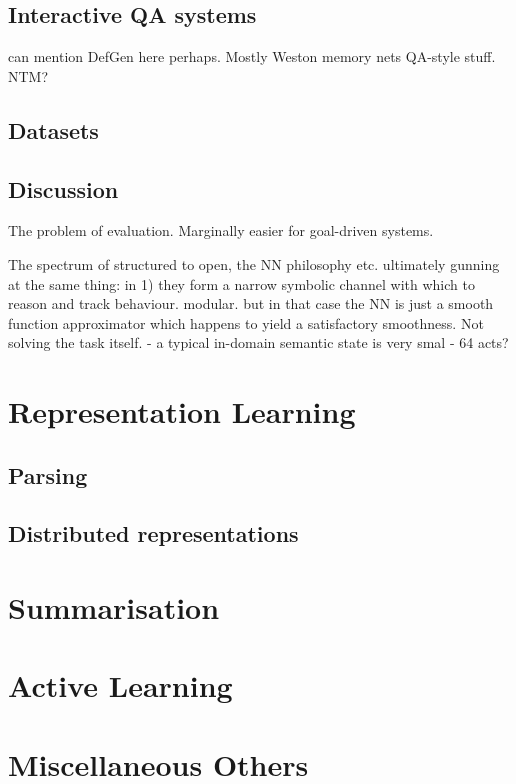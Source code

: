 \documentclass[11pt,letterpaper]{article}
\begin{document}
\subsection{Interactive QA systems}

can mention DefGen here perhaps. Mostly Weston memory nets QA-style stuff. NTM? 

\subsection{Datasets}

\subsection{Discussion}

The problem of evaluation. Marginally easier for goal-driven systems. 

The spectrum of structured to open, the NN philosophy etc. 
ultimately gunning at the same thing: in 1) they form a narrow symbolic channel with which to reason and track behaviour. modular. but in that case the NN is just a smooth function approximator which happens to yield a satisfactory smoothness. Not solving the task itself. 
- a typical in-domain semantic state is very smal - 64 acts? 


\cite{serban2015hierarchical}
\cite{serban2016multiresolution}
\cite{serban2016hierarchical}
\cite{li2015diversity}
\cite{li2016persona}
\cite{li2016deep} %
\cite{vinyals2015neural} %

\cite{su2016line}




\cite{liu2016not}
\cite{su2015learning}


\cite{lowe2015ubuntu}
\cite{serban2015survey}

\section{Representation Learning}
\subsection{Parsing}
\subsection{Distributed representations}

\section{Summarisation}

\section{Active Learning}

\section{Miscellaneous Others}












\end{document}
